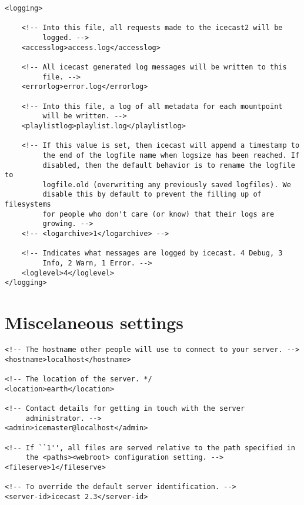 \begin{lstlisting}
<logging>

    <!-- Into this file, all requests made to the icecast2 will be
         logged. -->
    <accesslog>access.log</accesslog>

    <!-- All icecast generated log messages will be written to this
         file. -->
    <errorlog>error.log</errorlog>

    <!-- Into this file, a log of all metadata for each mountpoint
         will be written. -->
    <playlistlog>playlist.log</playlistlog>

    <!-- If this value is set, then icecast will append a timestamp to
         the end of the logfile name when logsize has been reached. If
         disabled, then the default behavior is to rename the logfile to
         logfile.old (overwriting any previously saved logfiles). We
         disable this by default to prevent the filling up of filesystems
         for people who don't care (or know) that their logs are
         growing. -->
    <!-- <logarchive>1</logarchive> -->

    <!-- Indicates what messages are logged by icecast. 4 Debug, 3
         Info, 2 Warn, 1 Error. -->
    <loglevel>4</loglevel>
</logging>
\end{lstlisting}


\section{Miscelaneous settings}

\begin{lstlisting}
<!-- The hostname other people will use to connect to your server. -->
<hostname>localhost</hostname>

<!-- The location of the server. */
<location>earth</location>

<!-- Contact details for getting in touch with the server
     administrator. -->
<admin>icemaster@localhost</admin>

<!-- If ``1'', all files are served relative to the path specified in
     the <paths><webroot> configuration setting. -->
<fileserve>1</fileserve>

<!-- To override the default server identification. -->
<server-id>icecast 2.3</server-id>
\end{lstlisting}



